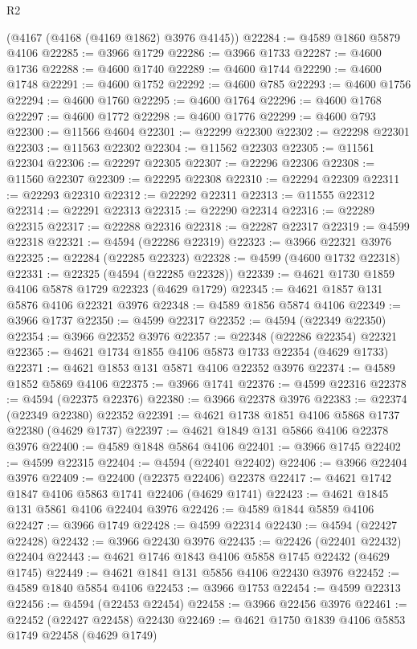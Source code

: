 \begin{lexlean}{R2}
\begin{coremodule}
    (@4167 (@4168 (@4169 @1862) @3976 @4145))
@22284 := @4589 @1860 @5879 @4106
@22285 := @3966 @1729
@22286 := @3966 @1733
@22287 := @4600 @1736
@22288 := @4600 @1740
@22289 := @4600 @1744
@22290 := @4600 @1748
@22291 := @4600 @1752
@22292 := @4600 @785
@22293 := @4600 @1756
@22294 := @4600 @1760
@22295 := @4600 @1764
@22296 := @4600 @1768
@22297 := @4600 @1772
@22298 := @4600 @1776
@22299 := @4600 @793
@22300 := @11566 @4604
@22301 := @22299 @22300
@22302 := @22298 @22301
@22303 := @11563 @22302
@22304 := @11562 @22303
@22305 := @11561 @22304
@22306 := @22297 @22305
@22307 := @22296 @22306
@22308 := @11560 @22307
@22309 := @22295 @22308
@22310 := @22294 @22309
@22311 := @22293 @22310
@22312 := @22292 @22311
@22313 := @11555 @22312
@22314 := @22291 @22313
@22315 := @22290 @22314
@22316 := @22289 @22315
@22317 := @22288 @22316
@22318 := @22287 @22317
@22319 := @4599 @22318
@22321 := @4594 (@22286 @22319)
@22323 := @3966 @22321 @3976
@22325 := @22284 (@22285 @22323)
@22328 := @4599 (@4600 @1732 @22318)
@22331 := @22325 (@4594 (@22285 @22328))
@22339 := @4621 @1730 @1859 @4106 @5878 @1729 @22323 (@4629 @1729)
@22345 := @4621 @1857 @131 @5876 @4106 @22321 @3976
@22348 := @4589 @1856 @5874 @4106
@22349 := @3966 @1737
@22350 := @4599 @22317
@22352 := @4594 (@22349 @22350)
@22354 := @3966 @22352 @3976
@22357 := @22348 (@22286 @22354) @22321
@22365 := @4621 @1734 @1855 @4106 @5873 @1733 @22354 (@4629 @1733)
@22371 := @4621 @1853 @131 @5871 @4106 @22352 @3976
@22374 := @4589 @1852 @5869 @4106
@22375 := @3966 @1741
@22376 := @4599 @22316
@22378 := @4594 (@22375 @22376)
@22380 := @3966 @22378 @3976
@22383 := @22374 (@22349 @22380) @22352
@22391 := @4621 @1738 @1851 @4106 @5868 @1737 @22380 (@4629 @1737)
@22397 := @4621 @1849 @131 @5866 @4106 @22378 @3976
@22400 := @4589 @1848 @5864 @4106
@22401 := @3966 @1745
@22402 := @4599 @22315
@22404 := @4594 (@22401 @22402)
@22406 := @3966 @22404 @3976
@22409 := @22400 (@22375 @22406) @22378
@22417 := @4621 @1742 @1847 @4106 @5863 @1741 @22406 (@4629 @1741)
@22423 := @4621 @1845 @131 @5861 @4106 @22404 @3976
@22426 := @4589 @1844 @5859 @4106
@22427 := @3966 @1749
@22428 := @4599 @22314
@22430 := @4594 (@22427 @22428)
@22432 := @3966 @22430 @3976
@22435 := @22426 (@22401 @22432) @22404
@22443 := @4621 @1746 @1843 @4106 @5858 @1745 @22432 (@4629 @1745)
@22449 := @4621 @1841 @131 @5856 @4106 @22430 @3976
@22452 := @4589 @1840 @5854 @4106
@22453 := @3966 @1753
@22454 := @4599 @22313
@22456 := @4594 (@22453 @22454)
@22458 := @3966 @22456 @3976
@22461 := @22452 (@22427 @22458) @22430
@22469 := @4621 @1750 @1839 @4106 @5853 @1749 @22458 (@4629 @1749)

\end{coremodule}
\end{lexlean}
